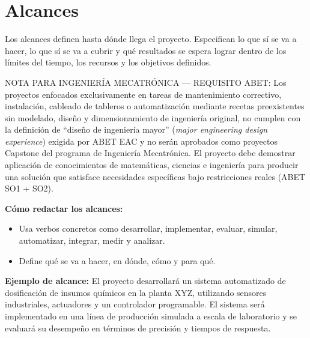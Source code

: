 \documentclass[12pt,letterpaper]{report}
\begin{document}
\section{Alcances}
\begin{instrucciones}
Los alcances definen hasta dónde llega el proyecto. Especifican lo que sí se va a hacer, lo que sí se va a cubrir y qué resultados se espera lograr dentro de los límites del tiempo, los recursos y los objetivos definidos.


\begin{advertenciaABET}
NOTA PARA INGENIERÍA MECATRÓNICA --- REQUISITO ABET: Los proyectos enfocados exclusivamente en tareas de mantenimiento correctivo, instalación, cableado de tableros o automatización mediante recetas preexistentes sin modelado, diseño y dimensionamiento de ingeniería original, no cumplen con la definición de ``diseño de ingeniería mayor'' (\textsl{major engineering design experience}) exigida por ABET EAC y no serán aprobados como proyectos Capstone del programa de Ingeniería Mecatrónica. El proyecto debe demostrar aplicación de conocimientos de matemáticas, ciencias e ingeniería para producir una solución que satisface necesidades específicas bajo restricciones reales (ABET SO1 + SO2).
\end{advertenciaABET}

\vspace{2mm}
\noindent \textbf{Cómo redactar los alcances:}
\begin{itemize}
  \item Usa verbos concretos como desarrollar, implementar, evaluar, simular, automatizar, integrar, medir y analizar.
  \item Define qué se va a hacer, en dónde, cómo y para qué.
\end{itemize}

\noindent \textbf{Ejemplo de alcance:} El proyecto desarrollará un sistema automatizado de dosificación de insumos químicos en la planta XYZ, utilizando sensores industriales, actuadores y un controlador programable. El sistema será implementado en una línea de producción simulada a escala de laboratorio y se evaluará su desempeño en términos de precisión y tiempos de respuesta.
\end{instrucciones}
\end{document}
